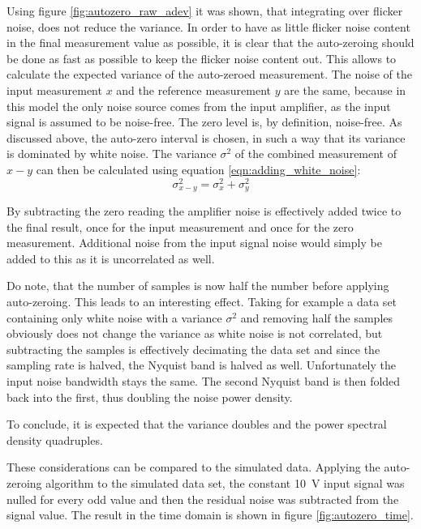 Using figure \ref{fig:autozero_raw_adev} it was shown, that integrating over flicker noise, does not reduce the variance. In order to have as little flicker noise content in the final measurement value as possible, it is clear that the auto-zeroing should be done as fast as possible to keep the flicker noise content out. This allows to calculate the expected variance of the auto-zeroed measurement. The noise of the input measurement $x$ and the reference measurement $y$ are the same, because in this model the only noise source comes from the input amplifier, as the input signal is assumed to be noise-free. The zero level is, by definition, noise-free. As discussed above, the auto-zero interval is chosen, in such a way that its variance is dominated by white noise. The variance $\sigma^2$ of the combined measurement of $x-y$ can then be calculated using equation \ref{eqn:adding_white_noise}:
\begin{equation}
    \sigma_{x-y}^2 = \sigma_x^2 + \sigma_y^2 \label{eqn:autozeroing}
\end{equation}

By subtracting the zero reading the amplifier noise is effectively added twice to the final result, once for the input measurement and once for the zero measurement. Additional noise from the input signal noise would simply be added to this as it is uncorrelated as well.

Do note, that the number of samples is now half the number before applying auto-zeroing. This leads to an interesting effect. Taking for example a data set containing only white noise with a variance $\sigma^2$ and removing half the samples obviously does not change the variance as white noise is not correlated, but subtracting the samples is effectively decimating the data set and since the sampling rate is halved, the Nyquist band is halved as well. Unfortunately the input noise bandwidth stays the same. The second Nyquist band is then folded back into the first, thus doubling the noise power density.

To conclude, it is expected that the variance doubles and the power spectral density quadruples.

These considerations can be compared to the simulated data. Applying the auto-zeroing algorithm to the simulated data set, the constant \qty{10}{\V} input signal was nulled for every odd value and then the residual noise was subtracted from the signal value. The result in the time domain is shown in figure \ref{fig:autozero_time}.


